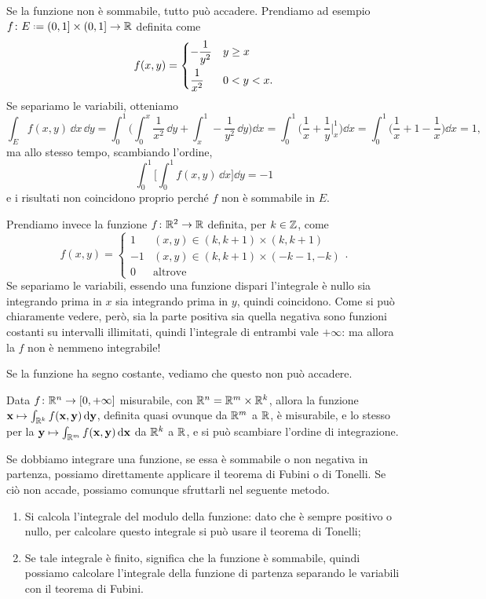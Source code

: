 Se la funzione non è sommabile, tutto può accadere.
Prendiamo ad esempio $f\colon E\defeq(0,1]\times(0,1]\to\R$ definita come
\begin{equation*}
	f(x,y)=
	\begin{dcases}
		-\frac1{y^2} &y\geq x\\
		\frac1{x^2} &0<y<x.
	\end{dcases}
\end{equation*}
Se separiamo le variabili, otteniamo
\begin{equation}
	\int_Ef(x,y)\,\dd x\,\dd y=\int_0^1\bigg(\int_0^x\frac1{x^2}\,\dd y+\int_x^1-\frac1{y^2}\,\dd y\bigg)\dd x=\int_0^1\bigg(\frac1{x}+\frac1{y}\bigg|_x^1\bigg)\dd x=\int_0^1\bigg(\frac1{x}+1-\frac1{x}\bigg)\dd x=1,
\end{equation}
ma allo stesso tempo, scambiando l'ordine,
\begin{equation}
	\int_0^1\bigg[\int_0^1f(x,y)\,\dd x\bigg]\dd y=-1
\end{equation}
e i risultati non coincidono proprio perch\'e $f$ non è sommabile in $E$.

Prendiamo invece la funzione $f\colon\mathbb{R}^2\to\mathbb{R}$ definita, per $k\in\mathbb{Z}$, come
\begin{equation*}
	f(x,y)=
	\begin{cases}
		1 &(x,y)\in(k,k+1)\times(k,k+1)\\
		-1 &(x,y)\in(k,k+1)\times(-k-1,-k)\\
		0 &\text{altrove}
	\end{cases}.
\end{equation*}
Se separiamo le variabili, essendo una funzione dispari l'integrale è nullo sia integrando prima in $x$ sia integrando prima in $y$, quindi coincidono.
Come si può chiaramente vedere, però, sia la parte positiva sia quella negativa sono funzioni costanti su intervalli illimitati, quindi l'integrale di entrambi vale $+\infty$: ma allora la $f$ non è nemmeno integrabile!

Se la funzione ha segno costante, vediamo che questo non può accadere.
\begin{teorema}[Tonelli] \label{t:tonelli}
	Data $f\colon\mathbb{R}^n\to[0,+\infty]$ misurabile, con $\mathbb{R}^n=\mathbb{R}^m\times\mathbb{R}^k$, allora la funzione $\mathbf{x}\mapsto\int_{\mathbb{R}^k}f(\mathbf{x},\mathbf{y})\,\textup{d}\mathbf{y}$, definita quasi ovunque da $\mathbb{R}^m$ a $\mathbb{R}$, è misurabile, e lo stesso per la $\mathbf{y}\mapsto\int_{\mathbb{R}^m}f(\mathbf{x},\mathbf{y})\,\textup{d}\mathbf{x}$ da $\mathbb{R}^k$ a $\mathbb{R}$, e si può scambiare l'ordine di integrazione.
\end{teorema}
Se dobbiamo integrare una funzione, se essa è sommabile o non negativa in partenza, possiamo direttamente applicare il teorema di Fubini o di Tonelli.
Se ciò non accade, possiamo comunque sfruttarli nel seguente metodo.
\begin{enumerate}
	\item Si calcola l'integrale del modulo della funzione: dato che è sempre positivo o nullo, per calcolare questo integrale si può usare il teorema di Tonelli;
	\item Se tale integrale è finito, significa che la funzione è sommabile, quindi possiamo calcolare l'integrale della funzione di partenza separando le variabili con il teorema di Fubini.
\end{enumerate}

